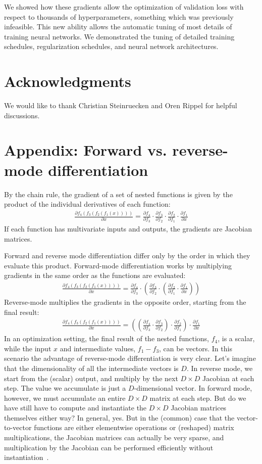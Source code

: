 \documentclass{article}
\newcommand{\pderiv}[2]{\frac{\partial #1}{\partial #2}}
\begin{document}
We showed how these gradients allow the optimization of validation loss with respect to thousands of hyperparameters, something which was previously infeasible.
This new ability allows the automatic tuning of most details of training neural networks.
We demonstrated the tuning of detailed training schedules, regularization schedules, and neural network architectures.

\section*{Acknowledgments}
We would like to thank Christian Steinruecken and Oren Rippel for helpful discussions.


\section*{Appendix: Forward vs. reverse-mode differentiation}
\label{sec:appendix}
By the chain rule, the gradient of a set of nested functions is given by the product of the individual derivatives of each function:
%
\begin{align*}
\pderiv{f_4(f_3(f_2(f_1(x))))}{x} = \pderiv{f_4}{f_3} \cdot \pderiv{f_3}{f_2} \cdot \pderiv{f_2}{f_1} \cdot \pderiv{f_1}{x}
\end{align*}
If each function has multivariate inputs and outputs, the gradients are
Jacobian matrices.

Forward and reverse mode differentiation differ
only by the order in which they evaluate this product.
%
Forward-mode differentiation works by multiplying gradients in the same order as
the functions are evaluated:
%
\begin{align*}
\pderiv{f_4(f_3(f_2(f_1(x))))}{x} = \pderiv{f_4}{f_3} \cdot \left( \pderiv{f_3}{f_2} \cdot \left( \pderiv{f_2}{f_1} \cdot \pderiv{f_1}{x} \right) \right)
\end{align*}
%
Reverse-mode multiplies the gradients in the opposite order, starting from the
final result:
%
\begin{align*}
\pderiv{f_4(f_3(f_2(f_1(x))))}{x} = \left(  \left(  \pderiv{f_4}{f_3} \cdot \pderiv{f_3}{f_2} \right) \cdot \pderiv{f_2}{f_1} \right) \cdot \pderiv{f_1}{x} 
\end{align*}
%
In an optimization setting, the final result of the nested functions, $f_4$, is
a scalar, while the input $x$ and intermediate values, $f_1 - f_3$, can be
vectors. In this scenario the advantage of reverse-mode
differentiation is very clear. Let's imagine that the dimensionality of all the
intermediate vectors is $D$. In reverse mode, we start from the (scalar) output,
and multiply by the next $D \times D$ Jacobian at each step. The value we
accumulate is just a $D$-dimensional vector. In forward mode, however, we must
accumulate an entire $D \times D$ matrix at each step. But do we have still
have to compute and instantiate the $D \times D$ Jacobian matrices themselves
either way?  In general, yes. But in the (common) case that the vector-to-vector
functions are either elementwise operations or (reshaped) matrix multiplications, the
Jacobian matrices can actually be very sparse, and multiplication by the
Jacobian can be performed efficiently without instantiation~\cite{pearlmutter2008reverse}.
\end{document}
